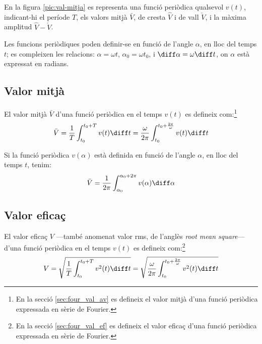 En la figura \vref{pic:val-mitja} es representa una funció periòdica qualsevol $v(t)$, indicant-hi el període $T$, els valors mitjà $\bar{V}$, de cresta $\hat{V}$ i de vall $\check{V}$, i la màxima amplitud  $\hat{V}-\check{V}$.
\begin{center}
    
    \label{pic:val-mitja}
\end{center}

Les funcions periòdiques poden  definir-se en funció de l'angle $\alpha$, en lloc del temps $t$; es compleixen les relacions:
$\alpha=\omega t$, $\alpha_0=\omega t_0$, i $\diff\alpha=\omega\diff t$, on $\alpha$ està expressat  en radians.

\subsection{Valor mitjà}

El valor mitjà $\bar{V}$ d'una funció
periòdica en el temps $v(t)$ es
defineix com:\footnote{En la secció \ref{sec:four_val_av} es defineix el valor mitjà d'una funció periòdica expressada en sèrie de Fourier.}
\begin{equation}
    \bar{V} = \frac{1}{T} \int_{t_0}^{t_0+T} v(t) \diff t =
    \frac{\omega}{2\pi} \int_{t_0}^{t_0+\frac{2\pi}{\omega}} v(t) \diff t\label{eq:vm_t}
\end{equation}

Si la funció periòdica $v(\alpha)$ està definida en funció de
l'angle $\alpha$, en lloc del temps $t$, tenim:
\begin{equation}
    \bar{V} = \frac{1}{2\pi} \int_{\alpha_0}^{\alpha_0+2\pi} v(\alpha) \diff \alpha
    \label{eq:vm_alfa}
\end{equation}

\subsection{Valor eficaç}

El valor eficaç  $V$ ---també anomenat valor rms, de l'anglès \textit{root mean square}--- d'una funció periòdica en el temps $v(t)$ es defineix com:\footnote{En la secció \ref{sec:four_val_ef} es defineix el valor eficaç d'una funció periòdica expressada en sèrie de Fourier.}
\begin{equation}
    V = \sqrt{\frac{1}{T} \int_{t_0}^{t_0+T} v^2(t) \diff
    t} = \sqrt{\frac{\omega}{2\pi} \int_{t_0}^{t_0+\frac{2\pi}{\omega}}
     v^2(t) \diff t}
\end{equation}


